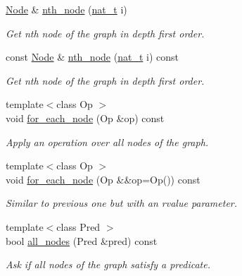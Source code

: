 \begin{DoxyCompactItemize}
\item 
\hyperlink{namespace_designar_a5af326c65aa2bd26b26c410f2030d09e}{Node} \& \hyperlink{class_designar_1_1_base_graph_ae4b7d560477f0b860d127a6ace6956e5}{nth\+\_\+node} (\hyperlink{namespace_designar_aa72662848b9f4815e7bf31a7cf3e33d1}{nat\+\_\+t} i)
\begin{DoxyCompactList}\small\item\em Get nth node of the graph in depth first order. \end{DoxyCompactList}\item 
const \hyperlink{namespace_designar_a5af326c65aa2bd26b26c410f2030d09e}{Node} \& \hyperlink{class_designar_1_1_base_graph_adc03e916cb6246c9eeba181df82fd149}{nth\+\_\+node} (\hyperlink{namespace_designar_aa72662848b9f4815e7bf31a7cf3e33d1}{nat\+\_\+t} i) const
\begin{DoxyCompactList}\small\item\em Get nth node of the graph in depth first order. \end{DoxyCompactList}\item 
{\footnotesize template$<$class Op $>$ }\\void \hyperlink{class_designar_1_1_base_graph_a9497531ac221edb5c5ef19888f78ad3c}{for\+\_\+each\+\_\+node} (Op \&op) const
\begin{DoxyCompactList}\small\item\em Apply an operation over all nodes of the graph. \end{DoxyCompactList}\item 
{\footnotesize template$<$class Op $>$ }\\void \hyperlink{class_designar_1_1_base_graph_aab8f765719514803f426b03939f519a1}{for\+\_\+each\+\_\+node} (Op \&\&op=Op()) const
\begin{DoxyCompactList}\small\item\em Similar to previous one but with an rvalue parameter. \end{DoxyCompactList}\item 
{\footnotesize template$<$class Pred $>$ }\\bool \hyperlink{class_designar_1_1_base_graph_abad9513273c1096aba652e211180061c}{all\+\_\+nodes} (Pred \&pred) const
\begin{DoxyCompactList}\small\item\em Ask if all nodes of the graph satisfy a predicate. \end{DoxyCompactList}\item 

\end{DoxyCompactItemize}
